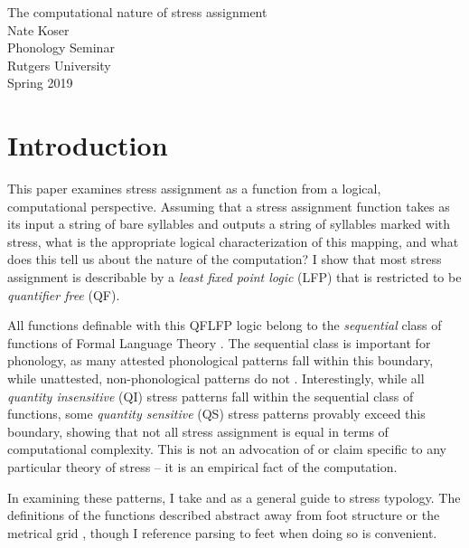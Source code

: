 \documentclass[12pt]{article}
\begin{document}
\begin{center}
{\LARGE The computational nature of stress assignment} \\
\vspace{1em}
Nate Koser \\
Phonology Seminar\\
Rutgers University \\
Spring 2019
\end{center}




\section{Introduction}

This paper examines stress assignment as a function from a logical, computational perspective. Assuming that a stress assignment function takes as its input a string of bare syllables and outputs a string of syllables marked with stress, what is the appropriate logical characterization of this mapping, and what does this tell us about the nature of the computation? I show that most stress assignment is describable by a \textit{least fixed point logic} (LFP) \citep{libkin04} that is restricted to be \textit{quantifier free} (QF).

All functions definable with this QFLFP logic belong to the \textit{sequential} class of functions of Formal Language Theory \citep{chandJardSeq}. The sequential class is important for phonology, as many attested phonological patterns fall within this boundary, while unattested, non-phonological patterns do not \citep{heinzlai13}. Interestingly, while all \textit{quantity insensitive} (QI) stress patterns fall within the sequential class of functions, some \textit{quantity sensitive} (QS) stress patterns provably exceed this boundary, showing that not all stress assignment is equal in terms of computational complexity. This is not an advocation of or claim specific to any particular theory of stress -- it is an empirical fact of the computation.

In examining these patterns, I take \citet{kager07} and \citet{gordon2002} as a general guide to stress typology. The definitions of the functions described abstract away from foot structure \citep{hayes95} or the metrical grid \citep{libprin77}, though I reference parsing to feet when doing so is convenient. 
\end{document}
